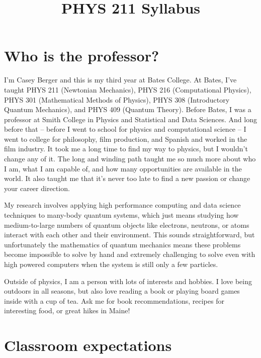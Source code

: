 \documentclass[
  letterpaper,
  DIV=11,
  numbers=noendperiod]{scrartcl}
\title{PHYS 211 Syllabus}
\author{}
\date{}
\renewcommand*\contentsname{Table of contents}
\newcommand\contentsname{Table of contents}
\begin{document}
\maketitle

\renewcommand*\contentsname{Table of contents}
{
\setcounter{tocdepth}{3}
\tableofcontents
}

\section{Who is the professor?}\label{who-is-the-professor}

I'm Casey Berger and this is my third year at Bates College. At Bates,
I've taught PHYS 211 (Newtonian Mechanics), PHYS 216 (Computational
Physics), PHYS 301 (Mathematical Methods of Physics), PHYS 308
(Introductory Quantum Mechanics), and PHYS 409 (Quantum Theory). Before
Bates, I was a professor at Smith College in Physics and Statistical and
Data Sciences. And long before that -- before I went to school for
physics and computational science -- I went to college for philosophy,
film production, and Spanish and worked in the film industry. It took me
a long time to find my way to physics, but I wouldn't change any of it.
The long and winding path taught me so much more about who I am, what I
am capable of, and how many opportunities are available in the world. It
also taught me that it's never too late to find a new passion or change
your career direction.

My research involves applying high performance computing and data
science techniques to many-body quantum systems, which just means
studying how medium-to-large numbers of quantum objects like electrons,
neutrons, or atoms interact with each other and their environment. This
sounds straightforward, but unfortunately the mathematics of quantum
mechanics means these problems become impossible to solve by hand and
extremely challenging to solve even with high powered computers when the
system is still only a few particles.

Outside of physics, I am a person with lots of interests and hobbies. I
love being outdoors in all seasons, but also love reading a book or
playing board games inside with a cup of tea. Ask me for book
recommendations, recipes for interesting food, or great hikes in Maine!

\section{Classroom expectations}\label{classexpectations}
\end{document}

